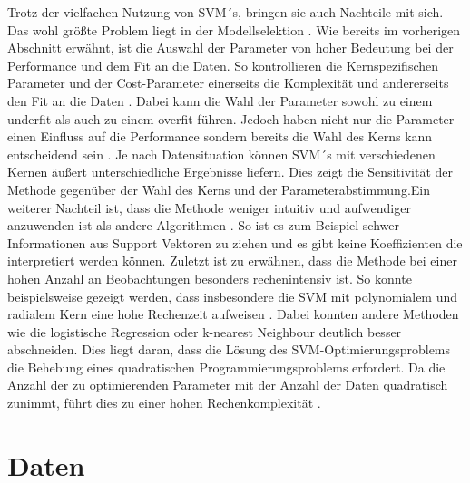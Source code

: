\documentclass[
]{article}
\begin{document}
Trotz der vielfachen Nutzung von SVM´s, bringen sie auch Nachteile mit
sich. Das wohl größte Problem liegt in der Modellselektion
\parencite{bennettSupportVectorMachines2000}. Wie bereits im vorherigen
Abschnitt erwähnt, ist die Auswahl der Parameter von hoher Bedeutung bei
der Performance und dem Fit an die Daten. So kontrollieren die
Kernspezifischen Parameter und der Cost-Parameter einerseits die
Komplexität und andererseits den Fit an die Daten
\parencite{kuhnAppliedPredictiveModeling2013}. Dabei kann die Wahl der
Parameter sowohl zu einem underfit als auch zu einem overfit führen.
Jedoch haben nicht nur die Parameter einen Einfluss auf die Performance
sondern bereits die Wahl des Kerns kann entscheidend sein
\parencite{burgesTutorialSupportVector1998}. Je nach Datensituation
können SVM´s mit verschiedenen Kernen äußert unterschiedliche Ergebnisse
liefern. Dies zeigt die Sensitivität der Methode gegenüber der Wahl des
Kerns und der Parameterabstimmung.\newline Ein weiterer Nachteil ist,
dass die Methode weniger intuitiv und aufwendiger anzuwenden ist als
andere Algorithmen \parencite{bennettSupportVectorMachines2000}. So ist
es zum Beispiel schwer Informationen aus Support Vektoren zu ziehen und
es gibt keine Koeffizienten die interpretiert werden können.\newline
Zuletzt ist zu erwähnen, dass die Methode bei einer hohen Anzahl an
Beobachtungen besonders rechenintensiv ist. So konnte beispielsweise
gezeigt werden, dass insbesondere die SVM mit polynomialem und radialem
Kern eine hohe Rechenzeit aufweisen
\parencite{scholzComparisonClassificationMethods2021}. Dabei konnten
andere Methoden wie die logistische Regression oder k-nearest Neighbour
deutlich besser abschneiden. Dies liegt daran, dass die Lösung des
SVM-Optimierungsproblems die Behebung eines quadratischen
Programmierungsproblems erfordert. Da die Anzahl der zu optimierenden
Parameter mit der Anzahl der Daten quadratisch zunimmt, führt dies zu
einer hohen Rechenkomplexität
\parencite{kecmanSupportVectorMachines2005}.

\section{Daten}
\end{document}
